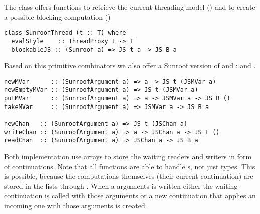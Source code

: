The class  offers functions to retrieve the 
current threading model () and to create a possible
blocking computation ()
\begin{verbatim}
class SunroofThread (t :: T) where
  evalStyle    :: ThreadProxy t -> T
  blockableJS :: (Sunroof a) => JS t a -> JS B a
\end{verbatim}
Based on this primitive combinators we also offer a Sunroof 
version of  and :  and .
\begin{verbatim}
newMVar      :: (SunroofArgument a) => a -> JS t (JSMVar a)
newEmptyMVar :: (SunroofArgument a) => JS t (JSMVar a)
putMVar      :: (SunroofArgument a) => a -> JSMVar a -> JS B ()
takeMVar     :: (SunroofArgument a) => JSMVar a -> JS B a

newChan   :: (SunroofArgument a) => JS t (JSChan a)
writeChan :: (SunroofArgument a) => a -> JSChan a -> JS t ()
readChan  :: (SunroofArgument a) => JSChan a -> JS B a
\end{verbatim}
Both implementation use arrays to store the waiting readers and
writers in form of continuations. Note that all functions
are able to handle s, not just 
types. This is possible, because the computations themselves
(their current continuation) are
stored in the lists through .
When a arguments is written either the waiting
continuation is called with those arguments or a new continuation 
that applies an incoming one with those arguments is created.

